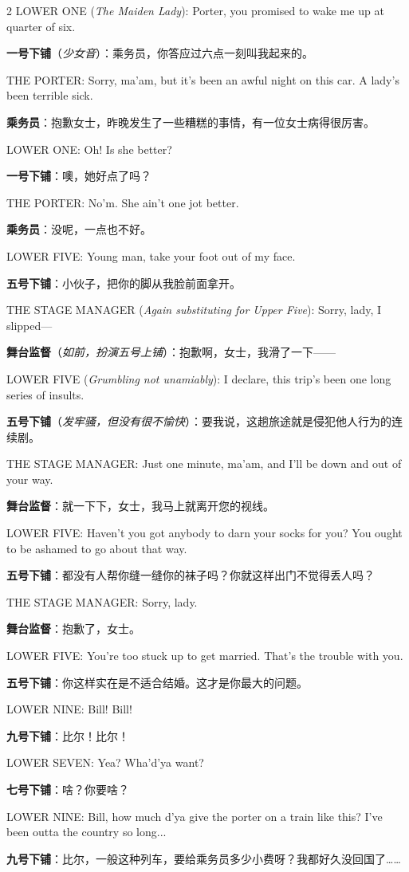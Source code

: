 \documentclass[lang=cn,newtx,10pt,scheme=chinese]{elegantbook}
\newcommand{\pair}[2]{%
\switchcolumn* #2\par
\switchcolumn  #1\par
}
\begin{document}
\begin{paracol}{2}
\pair{
    \textbf{一号下铺}（\textit{少女音}）：乘务员，你答应过六点一刻叫我起来的。
}{
    LOWER ONE (\textit{The Maiden Lady}): Porter, you promised to wake me up at quarter of six.
}

\pair{
    \textbf{乘务员}：抱歉女士，昨晚发生了一些糟糕的事情，有一位女士病得很厉害。
}{
    THE PORTER: Sorry, ma'am, but it's been an awful night on this car. A lady's been terrible sick.
}

\pair{
    \textbf{一号下铺}：噢，她好点了吗？
}{
    LOWER ONE: Oh! Is she better?
}

\pair{
    \textbf{乘务员}：没呢，一点也不好。
}{
    THE PORTER: No'm. She ain’t one jot better.
}

\pair{
    \textbf{五号下铺}：小伙子，把你的脚从我脸前面拿开。
}{
    LOWER FIVE: Young man, take your foot out of my face.
}

\pair{
    \textbf{舞台监督}（\textit{如前，扮演五号上铺}）：抱歉啊，女士，我滑了一下——
}{
    THE STAGE MANAGER (\textit{Again substituting for Upper Five}): Sorry, lady, I slipped—
}

\pair{
    \textbf{五号下铺}（\textit{发牢骚，但没有很不愉快}）：要我说，这趟旅途就是侵犯他人行为的连续剧。
}{
    LOWER FIVE (\textit{Grumbling not unamiably}): I declare, this trip's been one long series of insults.
}

\pair{
    \textbf{舞台监督}：就一下下，女士，我马上就离开您的视线。
}{
    THE STAGE MANAGER: Just one minute, ma'am, and I'll be down and out of your way.
}

\pair{
    \textbf{五号下铺}：都没有人帮你缝一缝你的袜子吗？你就这样出门不觉得丢人吗？
}{
    LOWER FIVE: Haven't you got anybody to darn your socks for you? You ought to be ashamed to go about that way.
}

\pair{
    \textbf{舞台监督}：抱歉了，女士。
}{
    THE STAGE MANAGER: Sorry, lady.
}

\pair{
    \textbf{五号下铺}：你这样实在是不适合结婚。这才是你最大的问题。
}{
    LOWER FIVE: You're too stuck up to get married. That's the trouble with you.
}

\pair{
    \textbf{九号下铺}：比尔！比尔！
}{
    LOWER NINE: Bill! Bill!
}

\pair{
    \textbf{七号下铺}：啥？你要啥？
}{
    LOWER SEVEN: Yea? Wha'd'ya want?
}

\pair{
    \textbf{九号下铺}：比尔，一般这种列车，要给乘务员多少小费呀？我都好久没回国了……
}{
    LOWER NINE: Bill, how much d'ya give the porter on a train like this? I've been outta the country so long...
}


\end{paracol}
\end{document}
